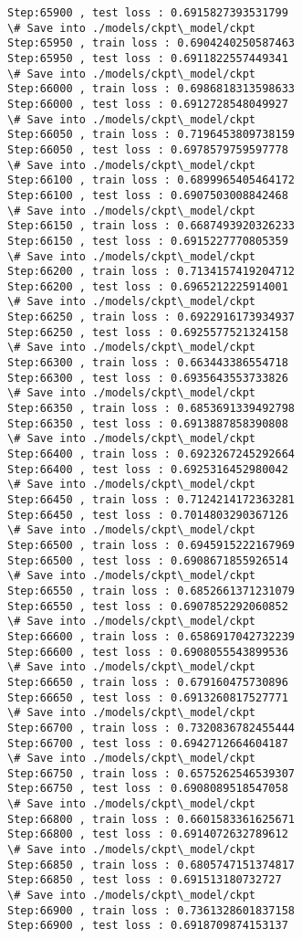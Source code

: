 \documentclass[11pt]{article}
\begin{document}
\begin{Verbatim}[commandchars=\\\{\}]
Step:65900 , test loss : 0.6915827393531799
\# Save into ./models/ckpt\_model/ckpt
Step:65950 , train loss : 0.6904240250587463
Step:65950 , test loss : 0.6911822557449341
\# Save into ./models/ckpt\_model/ckpt
Step:66000 , train loss : 0.6986818313598633
Step:66000 , test loss : 0.6912728548049927
\# Save into ./models/ckpt\_model/ckpt
Step:66050 , train loss : 0.7196453809738159
Step:66050 , test loss : 0.6978579759597778
\# Save into ./models/ckpt\_model/ckpt
Step:66100 , train loss : 0.6899965405464172
Step:66100 , test loss : 0.6907503008842468
\# Save into ./models/ckpt\_model/ckpt
Step:66150 , train loss : 0.6687493920326233
Step:66150 , test loss : 0.6915227770805359
\# Save into ./models/ckpt\_model/ckpt
Step:66200 , train loss : 0.7134157419204712
Step:66200 , test loss : 0.6965212225914001
\# Save into ./models/ckpt\_model/ckpt
Step:66250 , train loss : 0.6922916173934937
Step:66250 , test loss : 0.6925577521324158
\# Save into ./models/ckpt\_model/ckpt
Step:66300 , train loss : 0.663443386554718
Step:66300 , test loss : 0.6935643553733826
\# Save into ./models/ckpt\_model/ckpt
Step:66350 , train loss : 0.6853691339492798
Step:66350 , test loss : 0.6913887858390808
\# Save into ./models/ckpt\_model/ckpt
Step:66400 , train loss : 0.6923267245292664
Step:66400 , test loss : 0.6925316452980042
\# Save into ./models/ckpt\_model/ckpt
Step:66450 , train loss : 0.7124214172363281
Step:66450 , test loss : 0.7014803290367126
\# Save into ./models/ckpt\_model/ckpt
Step:66500 , train loss : 0.6945915222167969
Step:66500 , test loss : 0.6908671855926514
\# Save into ./models/ckpt\_model/ckpt
Step:66550 , train loss : 0.6852661371231079
Step:66550 , test loss : 0.6907852292060852
\# Save into ./models/ckpt\_model/ckpt
Step:66600 , train loss : 0.6586917042732239
Step:66600 , test loss : 0.6908055543899536
\# Save into ./models/ckpt\_model/ckpt
Step:66650 , train loss : 0.679160475730896
Step:66650 , test loss : 0.6913260817527771
\# Save into ./models/ckpt\_model/ckpt
Step:66700 , train loss : 0.7320836782455444
Step:66700 , test loss : 0.6942712664604187
\# Save into ./models/ckpt\_model/ckpt
Step:66750 , train loss : 0.6575262546539307
Step:66750 , test loss : 0.6908089518547058
\# Save into ./models/ckpt\_model/ckpt
Step:66800 , train loss : 0.6601583361625671
Step:66800 , test loss : 0.6914072632789612
\# Save into ./models/ckpt\_model/ckpt
Step:66850 , train loss : 0.6805747151374817
Step:66850 , test loss : 0.691513180732727
\# Save into ./models/ckpt\_model/ckpt
Step:66900 , train loss : 0.7361328601837158
Step:66900 , test loss : 0.6918709874153137

\end{Verbatim}
\end{document}

